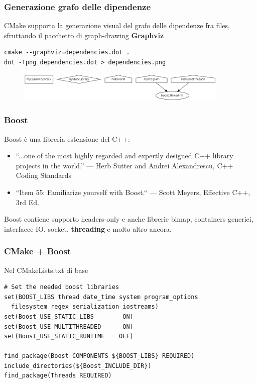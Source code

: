 \documentclass[10pt] {beamer}
\begin{document}
\begin{frame}[fragile]
 \frametitle{Generazione grafo delle dipendenze}
CMake supporta la generazione visual del grafo delle dipendenze fra files, sfruttando il pacchetto di graph-drawing \textbf{Graphviz}
\begin{verbatim}
cmake --graphviz=dependencies.dot .
dot -Tpng dependencies.dot > dependencies.png
\end{verbatim}
\begin{figure}[htb]
 \centering
 \includegraphics[width=0.9\textwidth]{images/dependencies.png}
\end{figure}
\end{frame}



\begin{frame}[fragile]
\frametitle{Boost}
Boost è una libreria estensione del C++:
\begin{itemize}
\item ``...one of the most highly regarded and expertly designed C++ library projects in the world.''
— Herb Sutter and Andrei Alexandrescu, C++ Coding Standards
\item ``Item 55: Familiarize yourself with Boost.``
— Scott Meyers, Effective C++, 3rd Ed.
\end{itemize}
Boost contiene supporto headers-only e anche librerie bimap, containers generici, interfacce IO, socket, \textbf{threading} e molto altro ancora.
\end{frame}

\begin{frame}[fragile]
 \frametitle{CMake + Boost}
Nel CMakeLists.txt di base
\begin{verbatim}
# Set the needed boost libraries 
set(BOOST_LIBS thread date_time system program_options 
  filesystem regex serialization iostreams)
set(Boost_USE_STATIC_LIBS        ON)
set(Boost_USE_MULTITHREADED      ON)
set(Boost_USE_STATIC_RUNTIME    OFF)

find_package(Boost COMPONENTS ${BOOST_LIBS} REQUIRED)
include_directories(${Boost_INCLUDE_DIR})
find_package(Threads REQUIRED)
\end{verbatim}

\end{frame}
\end{document}
